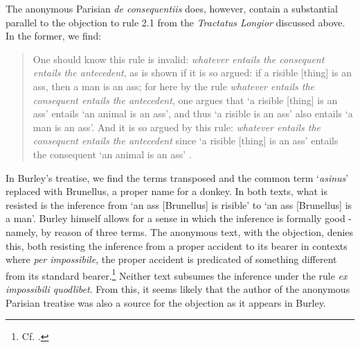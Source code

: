 	The anonymous Parisian \textit{de consequentiis} does, however, contain a substantial parallel to the objection to rule 2.1 from the \textit{Tractatus Longior} discussed above. In the former, we find: 
	\begin{quote}
		One should know this rule is invalid: \textit{whatever entails the consequent entails the antecedent}, as is shown if it is so argued: if a risible [thing] is an ass, then a man is an ass; for here by the rule \textit{whatever entails the consequent entails the antecedent}, one argues that `a risible [thing] is an ass' entails `an animal is an ass', and thus `a risible is an ass' also entails `a man is an ass'. And it is so argued by this rule: \textit{whatever entails the consequent entails the antecedent} since `a risible [thing] is an ass' entails the consequent `an animal is an ass' \autocite[p. 16, par. 21]{Green-Pedersen1980a}.
	\end{quote}
	In Burley's treatise, we find the terms transposed and the common term `\textit{asinus}' replaced with Brunellus, a proper name for a donkey. In both texts, what is resisted is the inference from `an ass [Brunellus] is risible' to `an ass [Brunellus] is a man'. Burley himself allows for a sense in which the inference is formally good - namely, by reason of three terms. The anonymous text, with the objection, denies this, both resisting the inference from a proper accident to its bearer in contexts where \textit{per impossibile}, the proper accident is predicated of something different from its standard bearer.\footnote{Cf. \autocite[q. 11, par. 19]{ScotusQE}.} Neither text subsumes the inference under the rule \textit{ex impossibili quodlibet}. From this, it seems likely that the author of the anonymous Parisian treatise was also a source for the objection as it appears in Burley.	
	
